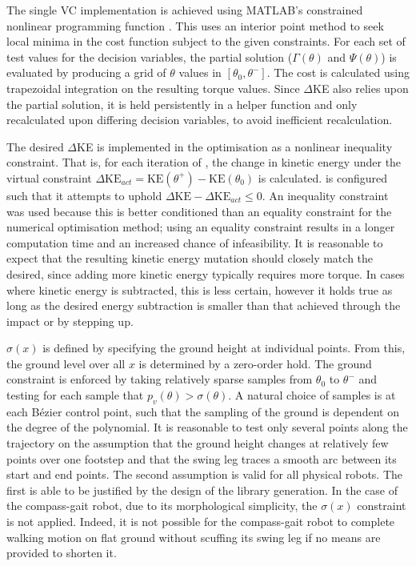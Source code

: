 The single VC implementation is achieved using MATLAB's constrained nonlinear programming function . This uses an interior point method to seek local minima in the cost function subject to the given constraints. For each set of test values for the decision variables, the partial solution ($\Gamma(\theta)$ and $\Psi(\theta)$) is evaluated by producing a grid of $\theta$ values in $[\theta_0, \theta^-]$. The cost is calculated using trapezoidal integration on the resulting torque values. Since $\Delta$KE also relies upon the partial solution, it is held persistently in a helper function and only recalculated upon differing decision variables, to avoid inefficient recalculation.

The desired $\Delta$KE is implemented in the optimisation as a nonlinear inequality constraint. That is, for each iteration of , the change in kinetic energy under the virtual constraint $\Delta\mathrm{KE}_{act}=\mathrm{KE}(\theta^+)-\mathrm{KE}(\theta_0)$ is calculated.  is configured such that it attempts to uphold $\Delta\mathrm{KE}-\Delta\mathrm{KE}_{act}\leq 0$. An inequality constraint was used because this is better conditioned than an equality constraint for the numerical optimisation method; using an equality constraint results in a longer computation time and an increased chance of infeasibility. It is reasonable to expect that the resulting kinetic energy mutation should closely match the desired, since adding more kinetic energy typically requires more torque. In cases where kinetic energy is subtracted, this is less certain, however it holds true as long as the desired energy subtraction is smaller than that achieved through the impact or by stepping up.

$\sigma(x)$ is defined by specifying the ground height at individual points. From this, the ground level over all $x$ is determined by a zero-order hold. The ground constraint is enforced by taking relatively sparse samples from $\theta_0$ to $\theta^-$ and testing for each sample that $p_v(\theta)>\sigma(\theta)$. A natural choice of samples is at each Bézier control point, such that the sampling of the ground is dependent on the degree of the polynomial. It is reasonable to test only several points along the trajectory on the assumption that the ground height changes at relatively few points over one footstep and that the swing leg traces a smooth arc between its start and end points. The second assumption is valid for all physical robots. The first is able to be justified by the design of the library generation. In the case of the compass-gait robot, due to its morphological simplicity, the $\sigma(x)$ constraint is not applied. Indeed, it is not possible for the compass-gait robot to complete walking motion on flat ground without scuffing its swing leg if no means are provided to shorten it.

